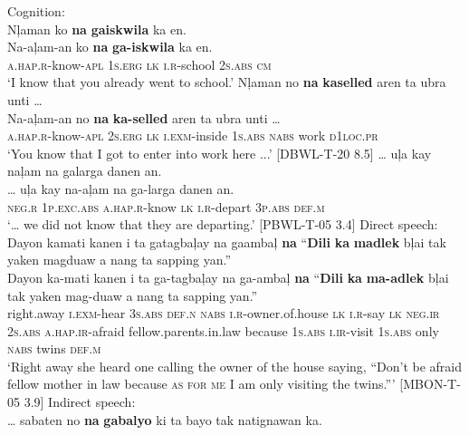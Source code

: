 \ea
Cognition: \\
Nļaman  ko  \textbf{na}  \textbf{gaiskwila}  ka  en. \smallskip\\
\gll Na-aļam-an  ko  \textbf{na}  \textbf{ga-iskwila}  ka  en. \\
\textsc{a.hap.r}-know-\textsc{apl}  1\textsc{s.erg}  \textsc{lk}  \textsc{i.r}-school  2\textsc{s.abs}  \textsc{cm} \\
\glt ‘I know that you already went to school.’
\z
\ea
Nļaman  no  \textbf{na}  \textbf{kaselled}  aren  ta  ubra  unti … \smallskip\\
\gll Na-aļam-an  no  \textbf{na}  \textbf{ka-selled}  aren  ta  ubra  unti … \\
\textsc{a.hap.r}-know-\textsc{apl}  2\textsc{s.erg}  \textsc{lk}  \textsc{i.exm}-inside  1\textsc{s.abs}  \textsc{nabs}  work  \textsc{d}1\textsc{loc.pr} \\
\glt ‘You know that  I got to enter into work here ...’ [DBWL-T-20 8.5]
\z
\ea
… uļa  kay  naļam  na  galarga  danen  an. \smallskip\\
\gll … uļa  kay  na-aļam  na  ga-larga  danen  an. \\
{} \textsc{neg.r}  1\textsc{p.exc.abs}  \textsc{a.hap.r}-know  \textsc{lk}  \textsc{i.r}-depart  3\textsc{p.abs}  \textsc{def.m} \\
\glt ‘… we did not know that  they are departing.’ [PBWL-T-05 3.4]
\z
\ea
Direct speech: \\
Dayon  kamati  kanen  i  ta  gatagbaļay  na gaambaļ  \textbf{na}  “\textbf{Dili}  \textbf{ka}  \textbf{madlek}  bļai  tak yaken  magduaw  a  nang  ta  sapping  yan.” \smallskip\\
\gll Dayon  ka-mati  kanen  i  ta  ga-tagbaļay  na ga-ambaļ  \textbf{na}  “\textbf{Dili}  \textbf{ka}  \textbf{ma-adlek}  bļai  tak yaken  mag-duaw  a  nang  ta  sapping  yan.” \\
right.away  \textsc{i.exm}-hear  3\textsc{s.abs}  \textsc{def.n}  \textsc{nabs}  \textsc{i.r}-owner.of.house  \textsc{lk}
\textsc{i.r}-say  \textsc{lk}  \textsc{neg.ir}  2\textsc{s.abs}  \textsc{a.hap.ir}-afraid  fellow.parents.in.law  because
1\textsc{s.abs}  \textsc{i.ir}-visit  1\textsc{s.abs}  only  \textsc{nabs}  twins  \textsc{def.m} \\
\glt `Right away she heard one calling the owner of the house saying, “Don’t be afraid fellow mother in law because \textsc{as for me} I am only visiting the twins.”' [MBON-T-05 3.9]
\z
\ea
Indirect speech: \\
… sabaten  no  \textbf{na}  \textbf{gabalyo}  ki  ta  bayo tak  natignawan  ka. \smallskip\\
